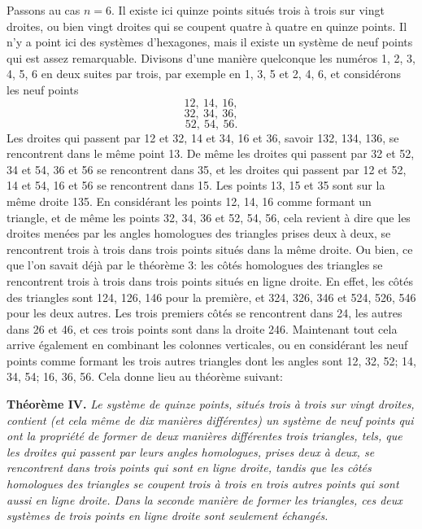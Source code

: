 \documentclass[12pt,a4paper]{article}
\begin{document}
Passons au cas $n = 6$. Il existe ici quinze points situ\'es trois \`a trois sur vingt droites, ou bien vingt droites qui se coupent quatre \`a quatre en quinze points. Il n'y a point ici des syst\`emes d'hexagones, mais il existe un syst\`eme de neuf points qui est assez remarquable. Divisons d'une mani\`ere quelconque les num\'eros 1, 2, 3, 4, 5, 6 en deux suites par trois, par exemple en 1, 3, 5 et 2, 4, 6, et consid\'erons les neuf points
\[
12,\ 14,\ 16,
\]
\[
32,\ 34,\ 36,
\]
\[
52,\ 54,\ 56.
\]
Les droites qui passent par 12 et 32, 14 et 34, 16 et 36, savoir 132, 134, 136, se rencontrent dans le m\^eme point 13. De m\^eme les droites qui passent par 32 et 52, 34 et 54, 36 et 56 se rencontrent dans 35, et les droites qui passent par 12 et 52, 14 et 54, 16 et 56 se rencontrent dans 15. Les points 13, 15 et 35 sont sur la m\^eme droite 135. En consid\'erant les points 12, 14, 16 comme formant un triangle, et de m\^eme les points 32, 34, 36 et 52, 54, 56, cela revient \`a dire que les droites men\'ees par les angles homologues des triangles prises deux \`a deux, se rencontrent trois \`a trois dans trois points situ\'es dans la m\^eme droite. Ou bien, ce que l'on savait d\'ej\`a par le th\'eor\`eme 3: les c\^ot\'es homologues des triangles se rencontrent trois \`a trois dans trois points situ\'es en ligne droite. En effet, les c\^ot\'es des triangles sont 124, 126, 146 pour la premi\`ere, et 324, 326, 346 et 524, 526, 546 pour les deux autres. Les trois premiers c\^ot\'es se rencontrent dans 24, les autres dans 26 et 46, et ces trois points sont dans la droite 246. Maintenant tout cela arrive \'egalement en combinant les colonnes verticales, ou en consid\'erant les neuf points comme formant les trois autres triangles dont les angles sont 12, 32, 52; 14, 34, 54; 16, 36, 56. Cela donne lieu au th\'eor\`eme suivant:

\textbf{Th\'eor\`eme IV.} \emph{Le syst\`eme de quinze points, situ\'es trois \`a trois sur vingt droites, contient (et cela m\^eme de dix mani\`eres diff\'erentes) un syst\`eme de neuf points qui ont la propri\'et\'e de former de deux mani\`eres diff\'erentes trois triangles, tels, que les droites qui passent par leurs angles homologues, prises deux \`a deux, se rencontrent dans trois points qui sont en ligne droite, tandis que les c\^ot\'es homologues des triangles se coupent trois \`a trois en trois autres points qui sont aussi en ligne droite. Dans la seconde mani\`ere de former les triangles, ces deux syst\`emes de trois points en ligne droite sont seulement \'echang\'es.}
\end{document}
